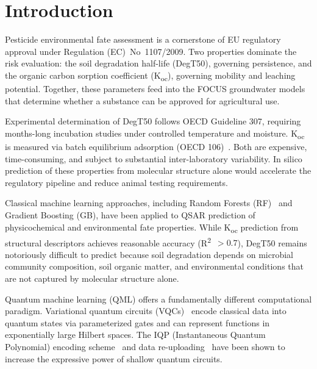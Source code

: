\documentclass[12pt,a4paper]{article}
\newcommand{\degtl}{DegT50}
\newcommand{\koc}{K\textsubscript{oc}}
\newcommand{\rtwo}{R\textsuperscript{2}}
\begin{document}
\newpage
\tableofcontents
\newpage

\section{Introduction}
\label{sec:intro}

Pesticide environmental fate assessment is a cornerstone of EU regulatory
approval under Regulation (EC)~No~1107/2009.\cite{ec1107_2009} Two
properties dominate the risk evaluation: the soil degradation half-life
(\degtl{}), governing persistence, and the organic carbon sorption
coefficient (\koc{}), governing mobility and leaching potential. Together,
these parameters feed into the FOCUS groundwater models~\cite{focus2006}
that determine whether a substance can be approved for agricultural use.

Experimental determination of \degtl{} follows OECD Guideline
307,\cite{oecd307} requiring months-long incubation studies under
controlled temperature and moisture. \koc{} is measured via batch
equilibrium adsorption (OECD 106)~\cite{oecd106}. Both are expensive,
time-consuming, and subject to substantial inter-laboratory variability.
In silico prediction of these properties from molecular structure alone
would accelerate the regulatory pipeline and reduce animal testing
requirements.

Classical machine learning approaches, including Random Forests
(RF)~\cite{breiman2001} and Gradient Boosting (GB),\cite{friedman2001}
have been applied to QSAR prediction of physicochemical and environmental
fate properties.\cite{mansouri2018} While \koc{} prediction from
structural descriptors achieves reasonable accuracy (\rtwo{}~$> 0.7$),
\degtl{} remains notoriously difficult to predict because soil degradation
depends on microbial community composition, soil organic matter, and
environmental conditions that are not captured by molecular structure alone.

Quantum machine learning (QML) offers a fundamentally different
computational paradigm. Variational quantum circuits
(VQCs)~\cite{cerezo2021} encode classical data into quantum states via
parameterized gates and can represent functions in exponentially large
Hilbert spaces.\cite{havlicek2019} The IQP (Instantaneous Quantum
Polynomial) encoding scheme~\cite{schuld2019iqp} and data
re-uploading~\cite{perezslava2020} have been shown to increase the
expressive power of shallow quantum circuits.\cite{schuld2020}
\end{document}
